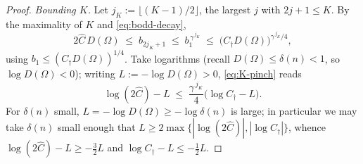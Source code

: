 \documentclass[11pt]{amsart}
\theoremstyle{definition}
\newcommand{\Om}{\Omega}
\newcommand{\abs}[1]{\left|#1\right|}
\begin{document}
\begin{proof}
\emph{Bounding $K$.} Let $j_K:=\lfloor(K-1)/2\rfloor$, the largest $j$
with $2j+1\le K$. By the maximality of $K$ and \eqref{eq:bodd-decay},
\begin{equation}\label{eq:K-pinch}
   2\widehat C\,D(\Om)\;\le\;b_{2j_K+1}\;\le\;b_1^{\,\gamma^{\,j_K}}
   \;\le\;\bigl(C_\dagger D(\Om)\bigr)^{\gamma^{\,j_K}/4},
\end{equation}
using $b_1\le(C_\dagger D(\Om))^{1/4}$.
Take logarithms (recall
$D(\Om)\le\delta(n)<1$, so $\log D(\Om)<0$); writing $L:=-\log D(\Om)>0$,
\eqref{eq:K-pinch} reads
\[
   \log(2\widehat C)-L
   \;\le\;\frac{\gamma^{\,j_K}}{4}\bigl(\log C_\dagger-L\bigr).
\]
For $\delta(n)$ small, $L=-\log D(\Om)\ge-\log\delta(n)$ is large; in
particular we may take $\delta(n)$ small enough that
$L\ge2\max\{\abs{\log(2\widehat C)},\abs{\log C_\dagger}\}$, whence
$\log(2\widehat C)-L\ge-\tfrac32 L$ and $\log C_\dagger-L\le-\tfrac12 L$.

\end{proof}
\end{document}
